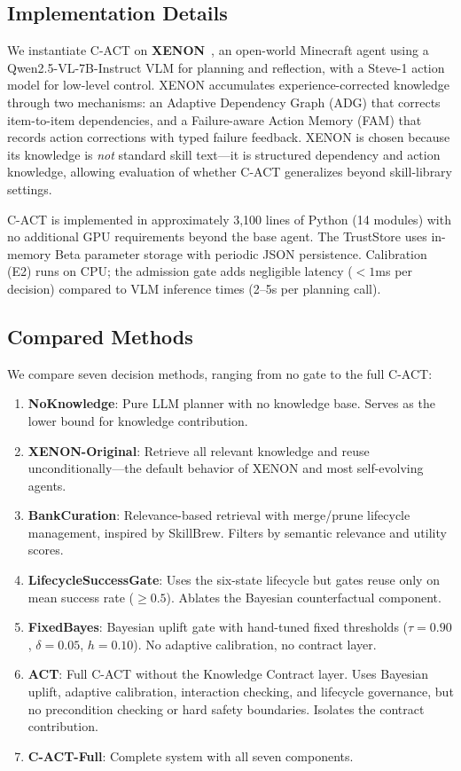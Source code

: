 \documentclass[letterpaper]{article}
\begin{document}
\subsection{Implementation Details}

We instantiate \textsc{C-ACT} on \textbf{\textsc{XENON}}~\cite{xenon2024}, an open-world Minecraft agent using a Qwen2.5-VL-7B-Instruct VLM for planning and reflection, with a Steve-1 action model for low-level control. \textsc{XENON} accumulates experience-corrected knowledge through two mechanisms: an Adaptive Dependency Graph (ADG) that corrects item-to-item dependencies, and a Failure-aware Action Memory (FAM) that records action corrections with typed failure feedback. \textsc{XENON} is chosen because its knowledge is \emph{not} standard skill text---it is structured dependency and action knowledge, allowing evaluation of whether \textsc{C-ACT} generalizes beyond skill-library settings.

\textsc{C-ACT} is implemented in approximately 3,100 lines of Python (14 modules) with no additional GPU requirements beyond the base agent. The TrustStore uses in-memory Beta parameter storage with periodic JSON persistence. Calibration (E2) runs on CPU; the admission gate adds negligible latency ($<1$ms per decision) compared to VLM inference times (2--5s per planning call).

\subsection{Compared Methods}

We compare seven decision methods, ranging from no gate to the full \textsc{C-ACT}:

\begin{enumerate}
    \item \textbf{NoKnowledge}: Pure LLM planner with no knowledge base. Serves as the lower bound for knowledge contribution.
    \item \textbf{XENON-Original}: Retrieve all relevant knowledge and reuse unconditionally---the default behavior of \textsc{XENON} and most self-evolving agents.
    \item \textbf{BankCuration}: Relevance-based retrieval with merge/prune lifecycle management, inspired by SkillBrew. Filters by semantic relevance and utility scores.
    \item \textbf{LifecycleSuccessGate}: Uses the six-state lifecycle but gates reuse only on mean success rate ($\ge 0.5$). Ablates the Bayesian counterfactual component.
    \item \textbf{FixedBayes}: Bayesian uplift gate with hand-tuned fixed thresholds ($\tau=0.90$, $\delta=0.05$, $h=0.10$). No adaptive calibration, no contract layer.
    \item \textbf{ACT}: Full \textsc{C-ACT} without the Knowledge Contract layer. Uses Bayesian uplift, adaptive calibration, interaction checking, and lifecycle governance, but no precondition checking or hard safety boundaries. Isolates the contract contribution.
    \item \textbf{\textsc{C-ACT}-Full}: Complete system with all seven components.
\end{enumerate}
\end{document}
